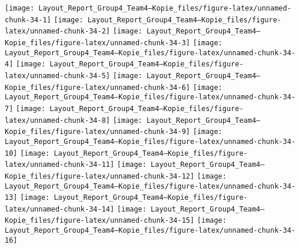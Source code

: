 \documentclass[
  parskip,
  oneside]{scrreprt}
\begin{document}
\texttt{[image: Layout\_Report\_Group4\_Team4---Kopie\_files/figure-latex/unnamed-chunk-34-1]}
\texttt{[image: Layout\_Report\_Group4\_Team4---Kopie\_files/figure-latex/unnamed-chunk-34-2]}
\texttt{[image: Layout\_Report\_Group4\_Team4---Kopie\_files/figure-latex/unnamed-chunk-34-3]}
\texttt{[image: Layout\_Report\_Group4\_Team4---Kopie\_files/figure-latex/unnamed-chunk-34-4]}
\texttt{[image: Layout\_Report\_Group4\_Team4---Kopie\_files/figure-latex/unnamed-chunk-34-5]}
\texttt{[image: Layout\_Report\_Group4\_Team4---Kopie\_files/figure-latex/unnamed-chunk-34-6]}
\texttt{[image: Layout\_Report\_Group4\_Team4---Kopie\_files/figure-latex/unnamed-chunk-34-7]}
\texttt{[image: Layout\_Report\_Group4\_Team4---Kopie\_files/figure-latex/unnamed-chunk-34-8]}
\texttt{[image: Layout\_Report\_Group4\_Team4---Kopie\_files/figure-latex/unnamed-chunk-34-9]}
\texttt{[image: Layout\_Report\_Group4\_Team4---Kopie\_files/figure-latex/unnamed-chunk-34-10]}
\texttt{[image: Layout\_Report\_Group4\_Team4---Kopie\_files/figure-latex/unnamed-chunk-34-11]}
\texttt{[image: Layout\_Report\_Group4\_Team4---Kopie\_files/figure-latex/unnamed-chunk-34-12]}
\texttt{[image: Layout\_Report\_Group4\_Team4---Kopie\_files/figure-latex/unnamed-chunk-34-13]}
\texttt{[image: Layout\_Report\_Group4\_Team4---Kopie\_files/figure-latex/unnamed-chunk-34-14]}
\texttt{[image: Layout\_Report\_Group4\_Team4---Kopie\_files/figure-latex/unnamed-chunk-34-15]}
\texttt{[image: Layout\_Report\_Group4\_Team4---Kopie\_files/figure-latex/unnamed-chunk-34-16]}
\end{document}
